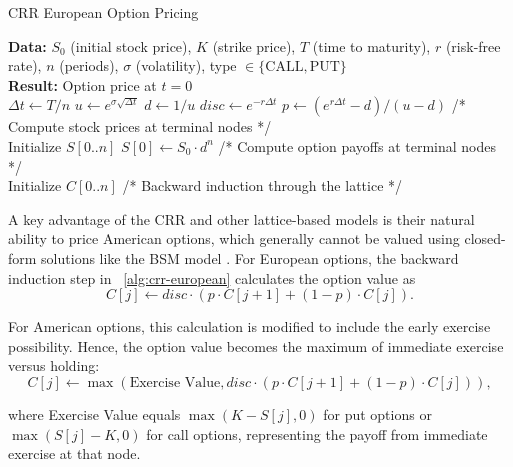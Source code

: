 \documentclass[english,12pt,a4paper,pdftex,sci,utf8]{aaltothesis}
\begin{document}
\begin{algorithm}
\caption{CRR European Option Pricing}
\label{alg:crr-european}
\textbf{Data:} $S_0$ (initial stock price), $K$ (strike price), $T$ (time to maturity), $r$ (risk-free rate), $n$ (periods), $\sigma$ (volatility), type $\in \{\text{CALL}, \text{PUT}\}$\\
\textbf{Result:} Option price at $t=0$\\
$\Delta t \gets T/n$\;
$u \gets e^{\sigma\sqrt{\Delta t}}$\;
$d \gets 1/u$\;
$disc \gets e^{-r\Delta t}$\;
$p \gets (e^{r\Delta t} - d)/(u - d)$\;
/* Compute stock prices at terminal nodes */\\
Initialize $S[0..n]$\;
$S[0] \gets S_0 \cdot d^n$\;
/* Compute option payoffs at terminal nodes */\\
Initialize $C[0..n]$\;
/* Backward induction through the lattice */\\

\;
\end{algorithm}

A key advantage of the CRR and other lattice-based models is their natural ability to price American options, which generally cannot be valued using closed-form solutions like the BSM model \cite{wilmott2013paul}. For European options, the backward induction step in ~\cref{alg:crr-european} calculates the option value as
\begin{equation*}
C[j] \gets disc \cdot (p \cdot C[j+1] + (1-p) \cdot C[j]).
\end{equation*}

For American options, this calculation is modified to include the early exercise possibility. Hence, the option value becomes the maximum of immediate exercise versus holding:
\begin{equation*}
C[j] \gets \max(\text{Exercise Value}, disc \cdot (p \cdot C[j+1] + (1-p) \cdot C[j])),
\end{equation*}

where Exercise Value equals $\max(K - S[j], 0)$ for put options or $\max(S[j] - K, 0)$ for call options, representing the payoff from immediate exercise at that node.
\end{document}
